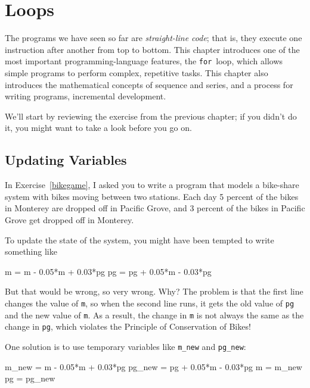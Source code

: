 \documentclass[../../book.tex]{subfiles}
\begin{document}
\chapter{Loops}
\label{loops}


The programs we have seen so far are \emph{straight-line code}; that is, they execute one instruction after another from top to bottom.
This chapter introduces one of the most important programming-language features, the \lstinline{for}~loop, which allows simple programs to perform complex, repetitive tasks. This chapter also introduces the mathematical concepts of sequence and series, and a process for writing programs, incremental development.

We'll start by reviewing the exercise from the previous chapter; if you didn't do it, you might want to take a look before you go on.

\section{Updating Variables}

In Exercise~\ref{bikegame}, I asked you to write a program that models a bike-share system with bikes moving between two stations.
Each day 5 percent of the bikes in Monterey are dropped off in Pacific Grove, and 3 percent of the bikes
in Pacific Grove get dropped off in Monterey.

To update the state of the system, you might have been tempted to write something
like


\begin{code}
m = m - 0.05*m + 0.03*pg
pg = pg + 0.05*m - 0.03*pg
\end{code}

But that would be wrong, so very wrong.  Why?  The problem is that
the first line changes the value of \lstinline{m}, so when the second line
runs, it gets the old value of \lstinline{pg} and the new value of \lstinline{m}.
As a result, the change in \lstinline{m} is not always the same as the
change in \lstinline{pg}, which violates the Principle of Conservation
of Bikes!

One solution is to use temporary variables like \lstinline{m_new} and \lstinline{pg_new}:

\begin{code}
m_new = m - 0.05*m + 0.03*pg
pg_new = pg + 0.05*m - 0.03*pg
m = m_new
pg = pg_new
\end{code}
\end{document}
